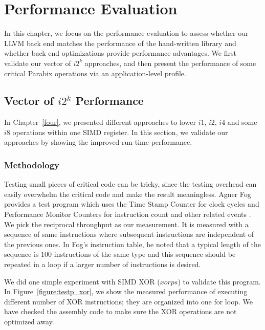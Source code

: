 %
%

\chapter{Performance Evaluation}
\label{six}

In this chapter, we focus on the performance evaluation to assess whether our LLVM back end matches the performance of the hand-written library and whether back end optimizations provide performance advantages. We first validate our vector of $i2^k$ approaches, and then present the performance of some critical Parabix operations via an application-level profile.

\section{Vector of $i2^k$ Performance}
In Chapter~\ref{four}, we presented different approaches to lower $i1$, $i2$, $i4$ and some $i8$ operations within one SIMD register. In this section, we validate our approaches by showing the improved run-time performance.

\subsection{Methodology}

Testing small pieces of critical code can be tricky, since the testing overhead can easily overwhelm the critical code and make the result meaningless. Agner Fog provides a test program which uses the Time Stamp Counter for clock cycles and Performance Monitor Counters for instruction count and other related events \cite{agner_testp}. We pick the reciprocal throughput as our measurement. It is measured with a sequence of same instructions where subsequent instructions are independent of the previous ones. In Fog's instruction table, he noted that a typical length of the sequence is 100 instructions of the same type and this sequence should be repeated in a loop if a larger number of instructions is desired.

We did one simple experiment with SIMD XOR ($xorps$) to validate this program. In Figure~\ref{figure:testp_xor}, we show the measured performance of executing different number of XOR instructions; they are organized into one for loop. We have checked the assembly code to make sure the XOR operations are not optimized away.

